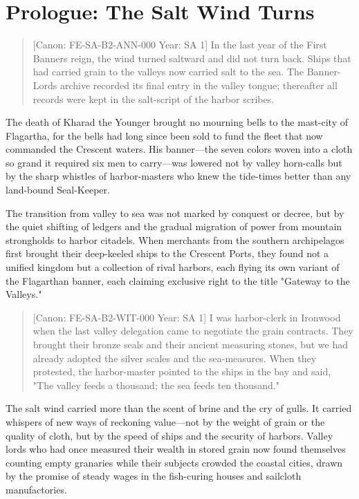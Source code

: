 \section{Prologue: The Salt Wind
Turns}\label{prologue-the-salt-wind-turns}

\begin{quote}
{[}Canon: FE-SA-B2-ANN-000 \textbar{} Year: SA 1{]} In the last year of
the First Banner\textquotesingle s reign, the wind turned saltward and
did not turn back. Ships that had carried grain to the valleys now
carried salt to the sea. The Banner-Lord\textquotesingle s archive
recorded its final entry in the valley tongue; thereafter all records
were kept in the salt-script of the harbor scribes.
\end{quote}

The death of Kharad the Younger brought no mourning bells to the
mast-city of Flagartha, for the bells had long since been sold to fund
the fleet that now commanded the Crescent waters. His banner---the seven
colors woven into a cloth so grand it required six men to carry---was
lowered not by valley horn-calls but by the sharp whistles of
harbor-masters who knew the tide-times better than any land-bound
Seal-Keeper.

The transition from valley to sea was not marked by conquest or decree,
but by the quiet shifting of ledgers and the gradual migration of power
from mountain strongholds to harbor citadels. When merchants from the
southern archipelagos first brought their deep-keeled ships to the
Crescent Ports, they found not a unified kingdom but a collection of
rival harbors, each flying its own variant of the Flagarthan banner,
each claiming exclusive right to the title "Gateway to the Valleys."

\begin{quote}
{[}Canon: FE-SA-B2-WIT-000 \textbar{} Year: SA 1{]} I was harbor-clerk
in Ironwood when the last valley delegation came to negotiate the grain
contracts. They brought their bronze seals and their ancient measuring
stones, but we had already adopted the silver scales and the
sea-measures. When they protested, the harbor-master pointed to the
ships in the bay and said, "The valley feeds a thousand; the sea feeds
ten thousand."
\end{quote}

The salt wind carried more than the scent of brine and the cry of gulls.
It carried whispers of new ways of reckoning value---not by the weight
of grain or the quality of cloth, but by the speed of ships and the
security of harbors. Valley lords who had once measured their wealth in
stored grain now found themselves counting empty granaries while their
subjects crowded the coastal cities, drawn by the promise of steady
wages in the fish-curing houses and sailcloth manufactories.

